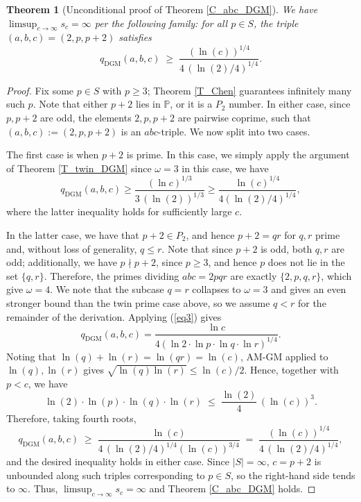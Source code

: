 \documentclass[11pt,letterpaper]{amsart}
\newtheorem{theorem}{Theorem}[section]
\def\ra{\rightarrow}
\begin{document}
\begin{theorem}[Unconditional proof of Theorem \ref{C_abc_DGM}]\label{T_Chen_DGM}
We have $\limsup_{c \ra \infty} s_c = \infty$ per the following family: for all $p\in S$, the triple $(a, b, c) = (2,p,p+2)$ satisfies
\[
q_{\mathrm{DGM}}(a, b, c) \;\ge\; \frac{(\ln(c))^{1/4}}{4\,(\ln (2)/4)^{1/4}}.
\]
\end{theorem}
\begin{proof}
Fix some $p\in S$ with $p\ge 3$; Theorem \ref{T_Chen} guarantees infinitely many such $p$. Note that either $p + 2$ lies in $\mathbb{P}$, or it is a $P_2$ number. In either case, since $p, p + 2$ are odd, the elements $2, p, p + 2$ are pairwise coprime, such that $(a, b, c) := (2, p, p + 2)$ is an $abc$-triple. We now split into two cases. 

The first case is when $p + 2$ is prime. In this case, we simply apply the argument of Theorem \ref{T_twin_DGM} since $\omega = 3$ in this case, we have
\[
q_{\mathrm{DGM}}(a, b, c) \ge \frac{(\ln c)^{1/3}}{3\,(\ln(2))^{1/3}} \ge \frac{\ln(c)^{1/4}}{4 (\ln(2)/4)^{1/4}},
\]
where the latter inequality holds for sufficiently large $c$.

In the latter case, we have that $p + 2 \in P_2$, and hence $p + 2 = qr$ for $q, r$ prime and, without loss of generality, $q \leq r$. Note that since $p+2$ is odd, both $q, r$ are odd; additionally, we have $p \nmid p + 2$, since $p \ge 3$, and hence $p$ does not lie in the set $\{q, r\}$. Therefore, the primes dividing $abc=2pqr$ are exactly $\{2,p,q,r\}$, which give $\omega = 4$. We note that the subcase $q = r$ collapses to $\omega = 3$ and gives an even stronger bound than the twin prime case above, so we assume $q < r$ for the remainder of the derivation. Applying (\ref{eq3}) gives
\[
q_{\mathrm{DGM}}(a, b, c) = \frac{\ln c}{4({\ln 2\cdot\ln p\cdot\ln q\cdot\ln r})^{1/4}}.
\]
Noting that $\ln(q) + \ln(r) = \ln(qr) = \ln(c)$, AM-GM applied to $\ln(q), \ln(r)$ gives $\sqrt{\ln(q) \ln(r)} \leq \ln(c)/2$. Hence, together with $p < c$, we have
\[
\ln (2)\cdot\ln (p)\cdot\ln (q)\cdot\ln (r) \;\le\; \frac{\ln (2)}{4}\,(\ln (c))^3.
\]
Therefore, taking fourth roots,
\[
q_{\mathrm{DGM}}(a,b,c) \;\ge\; \frac{\ln (c)}{4\,(\ln(2)/4)^{1/4}(\ln (c))^{3/4}} \;=\; \frac{(\ln (c))^{1/4}}{4\,(\ln (2)/4)^{1/4}},
\]
and the desired inequality holds in either case. Since $|S|=\infty$, $c=p+2$ is unbounded along such triples corresponding to $p\in S$, so the right-hand side tends to $\infty$. Thus, $\limsup_{c\to\infty}s_c=\infty$ and Theorem \ref{C_abc_DGM} holds.
\end{proof}
\end{document}
